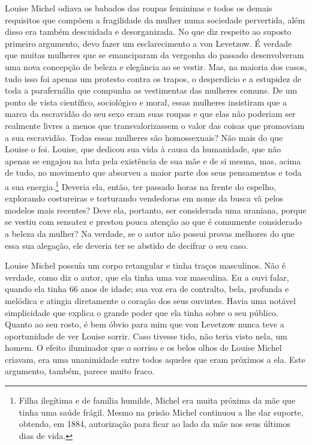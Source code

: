 Louise Michel odiava os babados das roupas femininas e todos os demais
requisitos que compõem a fragilidade da mulher numa sociedade
pervertida, além disso era também descuidada e desorganizada. No que diz
respeito ao suposto primeiro argumento, devo fazer um esclarecimento a
von Levetzow. É verdade que muitas mulheres que se emanciparam da
vergonha do passado desenvolveram uma nova concepção de beleza e
elegância ao se vestir. Mas, na maioria dos casos, tudo isso foi apenas
um protesto contra os trapos, o desperdício e a estupidez de toda a
parafernália que compunha as vestimentas das mulheres comuns. De um
ponto de vista científico, sociológico e moral, essas mulheres
insistiram que a marca da escravidão do seu sexo eram suas roupas e que
elas não poderiam ser realmente livres a menos que transvalorizassem o
valor das coisas que promoviam a sua escravidão. Todas essas mulheres
são homossexuais? Não mais do que Louise o foi. Louise, que dedicou sua
vida à causa da humanidade, que não apenas se engajou na luta pela
existência de sua mãe e de si mesma, mas, acima de tudo, no movimento
que absorveu a maior parte dos seus pensamentos e toda a sua
energia.\footnote{Filha ilegítima e de família humilde, Michel era muita
  próxima da mãe que tinha uma saúde frágil. Mesmo na prisão Michel
  continuou a lhe dar suporte, obtendo, em 1884, autorização para ficar
  ao lado da mãe nos seus últimos dias de vida.} Deveria ela, então, ter
passado horas na frente do espelho, explorando costureiras e torturando
vendedoras em nome da busca vã pelos modelos mais recentes? Deve ela,
portanto, ser considerada uma uraniana, porque se vestiu com sensatez e
prestou pouca atenção ao que é comumente considerado a beleza da mulher?
Na verdade, se o autor não possui provas melhores do que essa sua
alegação, ele deveria ter se abstido de decifrar o seu caso.

Louise Michel possuía um corpo retangular e tinha traços masculinos. Não
é verdade, como diz o autor, que ela tinha uma voz masculina. Eu a ouvi
falar, quando ela tinha 66 anos de idade; sua voz era de contralto,
bela, profunda e melódica e atingia diretamente o coração dos seus
ouvintes. Havia uma notável simplicidade que explica o grande poder que
ela tinha sobre o seu público. Quanto ao seu rosto, é bem óbvio para mim
que von Levetzow nunca teve a oportunidade de ver Louise sorrir. Caso
tivesse tido, não teria visto nela, um homem. O efeito iluminador que o
sorriso e os belos olhos de Louise Michel criavam, era uma unanimidade
entre todos aqueles que eram próximos a ela. Este argumento, também,
parece muito fraco.

